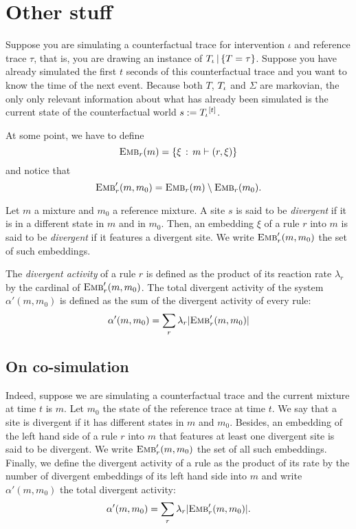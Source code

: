 \section*{Other stuff}

Suppose you are simulating a counterfactual trace for intervention
$\iota$ and reference trace $\tau$, that is, you are drawing an
instance of ${T_\iota\,|\,\{T=\tau\}}{}$. Suppose you have already simulated the first
$t$ seconds of this counterfactual trace and you want to know the time
of the next event. Because both $T$, ${T_\iota}{}$ and $\Sigma$ are
markovian, the only only relevant information about what has already
been simulated is the current state of the counterfactual world
$s := {T_\iota}{}^{[t]}$.

At some point, we have to define
\[{\textsc{Emb}}_{r}(m) = \{ \xi \,:\, m \vdash (r, \xi) \}\]
and notice that
\[{\textsc{Emb}}'_{r}(m, m_0) = {\textsc{Emb}}_{r}(m) \setminus {\textsc{Emb}}_{r}(m_0).\]


\begin{definition}
  Let $m$ a mixture and $m_0$ a reference mixture. A site $s$ is said
  to be \emph{divergent} if it is in a different state in $m$ and in
  $m_0$.  Then, an embedding $\xi$ of a rule $r$ into $m$ is said to
  be \emph{divergent} if it features a divergent site. We write
  ${\textsc{Emb}}'_{r}(m, m_0)$ the set of such embeddings.
\end{definition}

\begin{definition}
  The \emph{divergent activity} of a rule $r$ is defined as the
  product of its reaction rate $\lambda_r$ by the cardinal of
  ${\textsc{Emb}}'_{r}(m, m_0)$.  The total divergent activity of the system
  $\alpha'(m, m_0)$ is defined as the sum of the divergent activity of
  every rule:
  \[\alpha'(m, m_0) = \sum_r \lambda_r |{\textsc{Emb}}'_{r}(m, m_0)| \]
\end{definition}

\subsection*{On co-simulation}

Indeed, suppose we are simulating a counterfactual trace and the
current mixture at time $t$ is $m$. Let $m_0$ the state of the
reference trace at time $t$. We say that a site is divergent if it has
different states in $m$ and $m_0$.  Besides, an embedding of the left
hand side of a rule $r$ into $m$ that features at least one divergent
site is said to be divergent. We write ${\textsc{Emb}}'_{r}(m, m_0)$ the set of
all such embeddings.  Finally, we define the divergent activity of a
rule as the product of its rate by the number of divergent embeddings
of its left hand side into $m$ and write $\alpha'(m, m_0)$ the total
divergent activity:
\[\alpha'(m, m_0) = \sum_r \lambda_r |{\textsc{Emb}}'_{r}(m, m_0)|. \]


